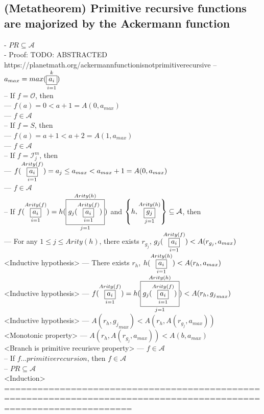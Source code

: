 \documentclass{book}
\newcommand{\set}[1]{\left\{ #1 \right\}}
\newcommand{\vdc}[3]{\underset{#2}{\overset{#3}{\fbox{$#1$}}}}
\begin{document}
\subsection{(Metatheorem) Primitive recursive functions are majorized by the Ackermann function} %
	- $PR \subseteq \mathcal{A}$ \\
	- Proof: TODO: ABSTRACTED \\ https://planetmath.org/ackermannfunctionisnotprimitiverecursive
		-- $a_{max} = max(\vdc{a_i}{i=1}{k})$ \\
		-- If $f = \mathcal{O}$, then \\
			--- $f(a) = 0 < a+1 = A(0, a_{max})$ \\
			--- $f \in \mathcal{A}$ \\
		-- If $f = S$, then \\
			--- $f(a) = a+1 < a+2 = A(1, a_{max})$ \\
			--- $f \in \mathcal{A}$ \\
		-- If $f = \mathcal{I}_j^m$, then \\
			--- $f(\vdc{a_i}{i=1}{Arity(f)}) = a_j \leq a_{max} < a_{max}+1 = A(0, a_{max})$ \\
			--- $f \in \mathcal{A}$ \\
		-- If $f(\vdc{a_i}{i=1}{Arity(f)}) = h(\vdc{g_j(\vdc{a_i}{i=1}{Arity(f)})}{j=1}{Arity(h)})$ and $\set{h, \vdc{g_j}{j=1}{Arity(h)}} \subseteq \mathcal{A}$, then \\
			--- For any $1 \leq j \leq Arity(h)$, there exists $r_{g_j}$, $g_j(\vdc{a_i}{i=1}{Arity(f)})	< A(r_{g_j}, a_{max})$ \\ <Inductive hypothesis>
			--- There exists $r_h$, $h(\vdc{a_i}{i=1}{Arity(h)}) < A(r_h, a_{max})$ \\ <Inductive hypothesis>
			--- $f(\vdc{a_i}{i=1}{Arity(f)}) = h(\vdc{g_j(\vdc{a_i}{i=1}{Arity(f)})}{j=1}{Arity(h)}) < A(r_h, {g_j}_{max})$ \\ <Inductive hypothesis>
			--- $A(r_h, {g_j}_{max}) < A(r_h, A(r_{g_j}, a_{max}))$ \\ <Monotonic property>
			--- $A(r_h, A(r_{g_j}, a_{max})) < A(b, a_{max})$ \\ <Branch is primitive recurisve property>
			--- $f \in \mathcal{A}$ \\
		-- If $f ... primitive recursion$, then $f \in \mathcal{A}$ \\
		-- $PR \subseteq \mathcal{A}$ \\ <Induction>
	===================================================================================================================
\end{document}
